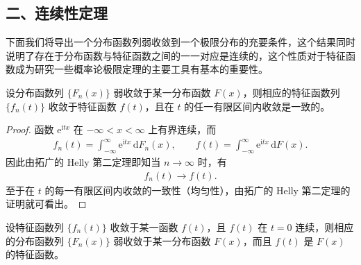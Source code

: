 \documentclass[../../main.tex]{subfiles}
\begin{document}
\subsection*{二、连续性定理}

下面我们将导出一个分布函数列弱收敛到一个极限分布的充要条件，这个结果同时说明了存在于分布函数与特征函数之间的一一对应是连续的，这个性质对于特征函数成为研究一些概率论极限定理的主要工具有基本的重要性。

\begin{theorem}[正极限定理]\label{theorem:ch05-正极限定理}
设分布函数列 $\{F_n(x)\}$ 弱收敛于某一分布函数 $F(x)$，则相应的特征函数列 $\{f_n(t)\}$ 收敛于特征函数 $f(t)$，且在 $t$ 的任一有限区间内收敛是一致的。
\end{theorem}

\begin{proof}
函数 $\mathrm{e}^{\mathrm{i}tx}$ 在 $-\infty<x<\infty$ 上有界连续，而
\begin{align*}
f_n(t)=\int_{-\infty}^{\infty}\mathrm{e}^{\mathrm{i}tx}\,\mathrm{d}F_n(x),\qquad
f(t)=\int_{-\infty}^{\infty}\mathrm{e}^{\mathrm{i}tx}\,\mathrm{d}F(x).
\end{align*}
因此由拓广的 Helly 第二定理即知当 $n\to\infty$ 时，有
\begin{align*}
f_n(t)\to f(t).
\end{align*}
至于在 $t$ 的每一有限区间内收敛的一致性（均匀性），由拓广的 Helly 第二定理的证明就可看出。
\end{proof}

\begin{theorem}[逆极限定理]\label{theorem:ch05-逆极限定理}
设特征函数列 $\{f_n(t)\}$ 收敛于某一函数 $f(t)$，且 $f(t)$ 在 $t=0$ 连续，则相应的分布函数列 $\{F_n(x)\}$ 弱收敛于某一分布函数 $F(x)$，而且 $f(t)$ 是 $F(x)$ 的特征函数。
\end{theorem}
\end{document}
